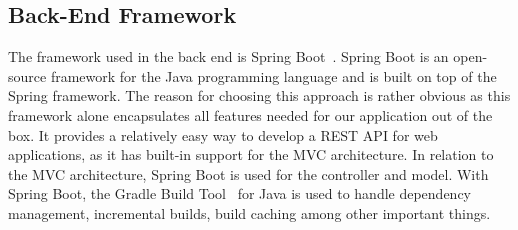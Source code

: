 \subsection{Back-End Framework}\label{subsec:back-end-framework}

The framework used in the back end is Spring Boot~\cite{springboot2024}.
Spring Boot is an open-source framework for the Java programming language and is built on top of the Spring framework.
The reason for choosing this approach is rather obvious as this framework alone encapsulates all features needed for our
application out of the box.
It provides a relatively easy way to develop a REST API for web applications, as it has built-in support for the MVC
architecture.
In relation to the MVC architecture, Spring Boot is used for the controller and model.
With Spring Boot, the Gradle Build Tool~\cite{gradle2024} for Java is used to handle dependency management, incremental
builds, build caching among other important things.
